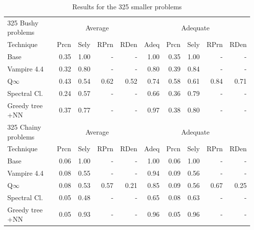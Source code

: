 \documentclass[EPiC]{easychair}
\begin{document}
\begin{table}[hbt]
\begin{center}
\begin{tabular}{|l|rrrr|r|rrrr|}
\hline
325 Bushy problems  & \multicolumn{4}{|c|}{Average} & \multicolumn{5}{|c|}{Adequate} \\
Technique       & Prcn & Sely & RPrn & RDen & Adeq & Prcn & Sely & RPrn & RDen \\
\hline
Base            & 0.35 & 1.00 &  -   &  -   & 1.00 & 0.35 & 1.00 &  -   &  -   \\
Vampire 4.4     & 0.32 & 0.80 &  -   &  -   & 0.80 & 0.39 & 0.84 &  -   &  -   \\
Q$\infty$       & 0.43 & 0.54 & 0.62 & 0.52 & 0.74 & 0.58 & 0.61 & 0.84 & 0.71 \\
Spectral Cl.    & 0.24 & 0.57 &  -   &  -   & 0.66 & 0.36 & 0.79 &  -   &  -   \\
Greedy tree +NN & 0.37 & 0.77 &  -   &  -   & 0.97 & 0.38 & 0.80 &  -   &  -   \\
\hline
325 Chainy problems & \multicolumn{4}{|c|}{Average} & \multicolumn{5}{|c|}{Adequate} \\
Technique       & Prcn & Sely & RPrn & RDen & Adeq & Prcn & Sely & RPrn & RDen \\
\hline
Base            & 0.06 & 1.00 &  -   &  -   & 1.00 & 0.06 & 1.00 &  -   &  -   \\
Vampire 4.4     & 0.08 & 0.55 &  -   &  -   & 0.94 & 0.09 & 0.56 &  -   &  -   \\
Q$\infty$       & 0.08 & 0.53 & 0.57 & 0.21 & 0.85 & 0.09 & 0.56 & 0.67 & 0.25 \\
Spectral Cl.    & 0.05 & 0.48 &  -   &  -   & 0.65 & 0.08 & 0.63 &  -   &  -   \\
Greedy tree +NN & 0.05 & 0.93 &  -   &  -   & 0.96 & 0.05 & 0.96 &  -   &  -   \\
\hline
\end{tabular}
\caption{Results for the 325 smaller problems}
\label{Results325}
\end{center}
\end{table}
\end{document}
